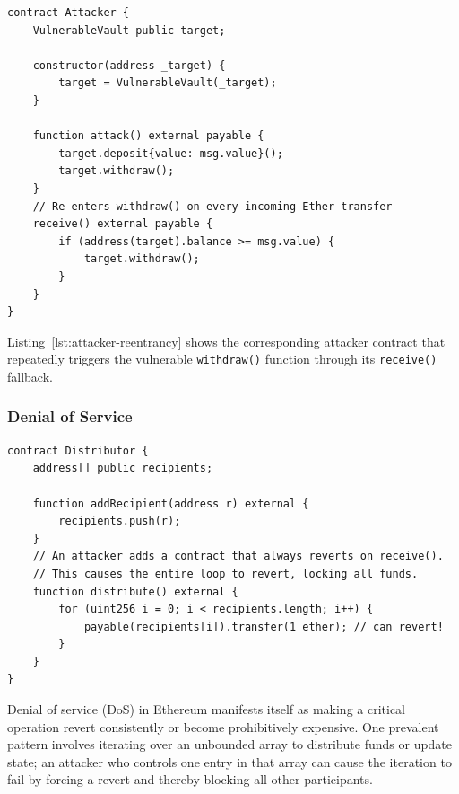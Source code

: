 \newpage

\begin{listing}[!ht]
\begin{verbatim}
contract Attacker {
    VulnerableVault public target;

    constructor(address _target) {
        target = VulnerableVault(_target);
    }

    function attack() external payable {
        target.deposit{value: msg.value}();
        target.withdraw();
    }
    // Re-enters withdraw() on every incoming Ether transfer
    receive() external payable {
        if (address(target).balance >= msg.value) {
            target.withdraw();
        }
    }
}
\end{verbatim}
\caption[Exploit of the reentrancy vulnerability.]{Attacker contract exploiting the reentrancy vulnerability in Listing~\ref{lst:vulnerable-vault}.}
\label{lst:attacker-reentrancy}
\end{listing}

Listing~\ref{lst:attacker-reentrancy} shows the corresponding attacker contract that repeatedly triggers the vulnerable \texttt{withdraw()} function through its \texttt{receive()} fallback.

\subsubsection*{Denial of Service}
\begin{listing}[!ht]
\begin{verbatim}
contract Distributor {
    address[] public recipients;

    function addRecipient(address r) external {
        recipients.push(r);
    }
    // An attacker adds a contract that always reverts on receive().
    // This causes the entire loop to revert, locking all funds.
    function distribute() external {
        for (uint256 i = 0; i < recipients.length; i++) {
            payable(recipients[i]).transfer(1 ether); // can revert!
        }
    }
}
\end{verbatim}
\caption[DoS contract vulnerability.]{Distributor contract vulnerable to DoS via a reverting recipient.}
\label{lst:dos-distributor}
\end{listing}

Denial of service (DoS) in Ethereum manifests itself as making a critical operation revert consistently or become prohibitively expensive. One prevalent pattern involves iterating over an unbounded array to distribute funds or update state; an attacker who controls one entry in that array can cause the iteration to fail by forcing a revert and thereby blocking all other participants.

